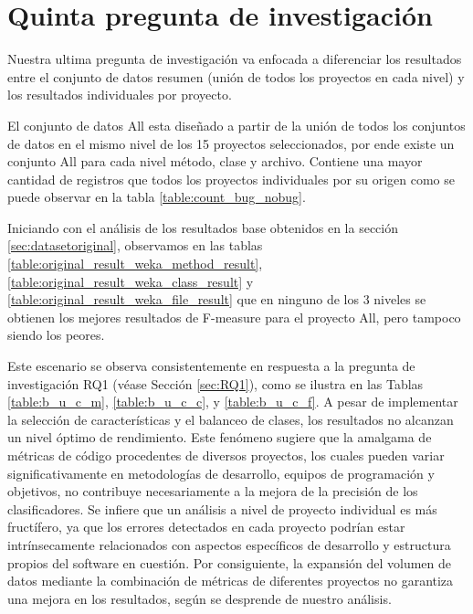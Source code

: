 \section{Quinta pregunta de investigación}
\label{sec:RQ5}

Nuestra ultima pregunta de investigación va enfocada a diferenciar los resultados entre el conjunto de datos resumen (unión de todos los proyectos en cada nivel) y los resultados individuales por proyecto.

\noindent{}
\vspace{12pt}

El conjunto de datos All esta diseñado a partir de la unión de todos los conjuntos de datos en el mismo nivel de los 15 proyectos seleccionados, por ende existe un conjunto All para cada nivel método, clase y archivo. Contiene una mayor cantidad de registros que todos los proyectos individuales por su origen como se puede observar en la tabla \ref{table:count_bug_nobug}.

Iniciando con el análisis de los resultados base obtenidos en la sección \ref{sec:datasetoriginal}, observamos en las tablas \ref{table:original_result_weka_method_result}, \ref{table:original_result_weka_class_result} y \ref{table:original_result_weka_file_result} que en ninguno de los 3 niveles se obtienen los mejores resultados de F-measure para el proyecto All, pero tampoco siendo los peores.



Este escenario se observa consistentemente en respuesta a la pregunta de investigación RQ1 (véase Sección \ref{sec:RQ1}), como se ilustra en las Tablas \ref{table:b_u_c_m}, \ref{table:b_u_c_c}, y \ref{table:b_u_c_f}. A pesar de implementar la selección de características y el balanceo de clases, los resultados no alcanzan un nivel óptimo de rendimiento. Este fenómeno sugiere que la amalgama de métricas de código procedentes de diversos proyectos, los cuales pueden variar significativamente en metodologías de desarrollo, equipos de programación y objetivos, no contribuye necesariamente a la mejora de la precisión de los clasificadores. Se infiere que un análisis a nivel de proyecto individual es más fructífero, ya que los errores detectados en cada proyecto podrían estar intrínsecamente relacionados con aspectos específicos de desarrollo y estructura propios del software en cuestión. Por consiguiente, la expansión del volumen de datos mediante la combinación de métricas de diferentes proyectos no garantiza una mejora en los resultados, según se desprende de nuestro análisis.

